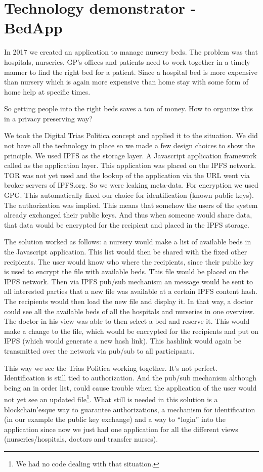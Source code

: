 \documentclass{article}
\begin{document}
\section{Technology demonstrator - BedApp}
In 2017 we created an application to manage nursery beds. The problem was that hospitals, nurseries, GP's offices and patients need to work together in a timely manner to find the right bed for a patient. Since a hospital bed is more expensive than nursery which is again more expensive than home stay with some form of home help at specific times.

So getting people into the right beds saves a ton of money. How to organize this in a privacy preserving way?

We took the Digital Trias Politica concept and applied it to the situation. We did not have all the technology in place so we made a few design choices to show the principle. We used IPFS as the storage layer. A Javascript application framework called  as the application layer. This application was placed on the IPFS network. TOR was not yet used and the lookup of the application via the URL went via broker servers of IPFS.org. So we were leaking meta-data. For encryption we used GPG. This automatically fixed our choice for identification (known public keys). The authorization was implied. This means that somehow the users of the system already exchanged their public keys. And thus when someone would share data, that data would be encrypted for the recipient and placed in the IPFS storage.

The solution worked as follows: a nursery would make a list of available beds in the Javascript application. This list would then be shared with the fixed other recipients. The user would know who where the recipients, since their public key is used to encrypt the file with available beds. This file would be placed on the IPFS network. Then via IPFS pub/sub mechanism an message would be sent to all interested parties that a new file was available at a certain IPFS content hash. The recipients would then load the new file and display it. In that way, a doctor could see all the available beds of all the hospitals and nurseries in one overview. The doctor in his view was able to then select a bed and reserve it. This would make a change to the file, which would be encrypted for the recipients and put on IPFS (which would generate a new hash link). This hashlink would again be transmitted over the network via pub/sub to all participants.

This way we see the Trias Politica working together. It's not perfect. Identification is still tied to authorization. And the pub/sub mechanism although being an in order list, could cause trouble when the application of the user would not yet see an updated file\footnote{We had no code dealing with that situation.}. What still is needed in this solution is a blockchain'esque way to guarantee authorizations, a mechanism for identification (in our example the public key exchange) and a way to ``login'' into the application since now we just had one application for all the different views (nurseries/hospitals, doctors and transfer nurses).
\end{document}
